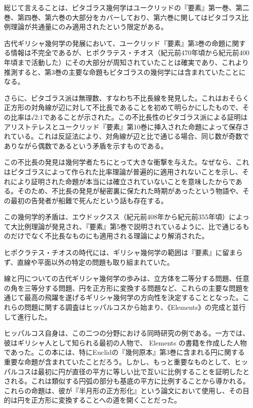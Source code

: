 \documentclass[a4paper,11pt,openany]{ltjsbook}
\begin{document}
総じて言えることは、ピタゴラス幾何学はユークリッドの『要素』第一巻、第二巻、第四巻、第六巻の大部分をカバーしており、第六巻に関してはピタゴラス比例理論が共通量にのみ適用されたという限定がある。

古代ギリシャ幾何学の発展において、ユークリッド『要素』第3巻の命題に関する情報は不完全であるが、ヒポクラテス・チオス（紀元前470年頃から紀元前400年頃まで活動した）にその大部分が周知されていたことは確実であり、これより推測すると、第3巻の主要な命題もピタゴラスの幾何学には含まれていたことになる。

さらに、ピタゴラス派は無理数、すなわち不比長線を発見した。これはおそらく正方形の対角線が辺に対して不比長であることを初めて明らかにしたもので、その比率は√2:1であることが示された。この不比長性のピタゴラス派による証明はアリストテレスとユークリッド『要素』第10巻に挿入された命題によって保存されている。これは反証法により、対角線が辺と比で通じる場合、同じ数が奇数でありながら偶数であるという矛盾を示すものである。

この不比長の発見は幾何学者たちにとって大きな衝撃を与えた。なぜなら、これはピタゴラスによって作られた比率理論が普遍的に適用されないことを示し、それにより証明された命題が本当には確立されていないことを意味したからである。そのため、不比長の発見が秘密裏に保たれた時期があったという物語や、その最初の告発者が船難で死んだという話も存在する。

この幾何学的矛盾は、エウドックスス（紀元前408年から紀元前355年頃）によって大比例理論が発見され、『要素』第5巻で説明されているように、比で通じるものだけでなく不比長なものにも適用される理論により解消された。

ヒポクラテス・チオスの時代には、ギリシャ幾何学の範囲は『要素』に留まらず、直線や平面以外の特定の問題も取り組まれていた。

線と円についての古代ギリシャ幾何学の歩みは、立方体を二等分する問題、任意の角を三等分する問題、円を正方形に変換する問題など、これらの主要な問題を通じて最高の飛躍を遂げるギリシャ幾何学の方向性を決定することとなった。これらの問題に関する調査はヒッパルコスから始まり、《Elements》の完成と並行して進行した。

ヒッパルコス自身は、この二つの分野における同時研究の例である。一方では、彼はギリシャ人として知られる最初の人物で、 Elements の書籍を作成した人物であった。この本には、特にEuclidの『幾何原本』第3巻に含まれる円に関する重要な命題が含まれていたことだろう。しかし、もっと重要なものとして、ヒッパルコスは最初に円が直径の平方に等しい比で互いに比例することを証明したとされる。これは類似する円弧の部分も基底の平方に比例することから導かれる。これらの命題は、彼が『半月形の正方形化』という論文において使用し、その目的は円を正方形に変換することへの道を開くことだった。
\end{document}
